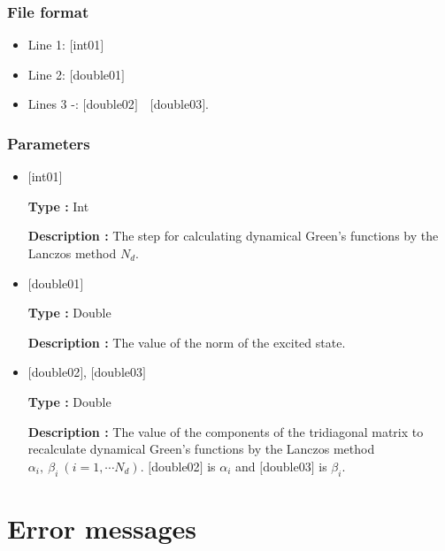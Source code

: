 \subsubsection{File format}
 \begin{itemize}
   \item  Line 1: $[$int01$]$
   \item  Line 2: $[$double01$]$
   \item  Lines 3 -: $[$double02$]$~~$[$double03$]$.
  \end{itemize}
  
\subsubsection{Parameters}
 \begin{itemize}

  \item  $[$int01$]$

 {\bf Type :} Int

 {\bf Description :} The step for calculating dynamical Green's functions by the Lanczos method $N_d$.

  \item  $[$double01$]$

 {\bf Type :} Double

{\bf Description :} The value of the norm of the excited state.
 
 \item  $[$double02$]$, $[$double03$]$

 {\bf Type :} Double

{\bf Description :} The value of the components of the tridiagonal matrix to recalculate dynamical Green's functions by the Lanczos method $\alpha_i,~\beta_i~(i =1,\cdots N_d)$.
$[$double02$]$ is $\alpha_i$ and $[$double03$]$ is $\beta_i$.\\
\end{itemize}

\newpage
\section{Error messages}

